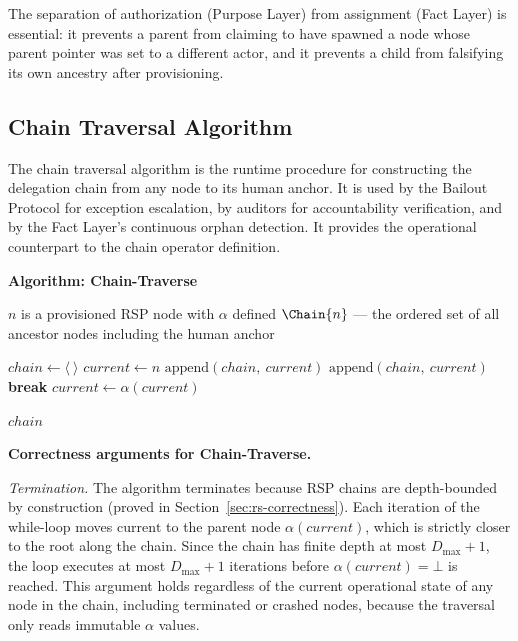 The separation of authorization (Purpose Layer) from assignment (Fact Layer) is essential: it prevents a parent from claiming to have spawned a node whose parent pointer was set to a different actor, and it prevents a child from falsifying its own ancestry after provisioning.

\subsection{Chain Traversal Algorithm}
\label{sec:chain-traversal-algorithm}

The chain traversal algorithm is the runtime procedure for constructing the delegation chain from any node to its human anchor. It is used by the Bailout Protocol for exception escalation, by auditors for accountability verification, and by the Fact Layer's continuous orphan detection. It provides the operational counterpart to the chain operator definition.

\medskip
\noindent\textbf{Algorithm: Chain-Traverse}

\begin{algorithm}
\caption{Chain-Traverse($n$) — Build the delegation chain from node $n$ to the human anchor}
\label{alg:chain-traverse}
\begin{algorithmic}[1]
\REQUIRE $n$ is a provisioned RSP node with $\alpha$ defined
\ENSURE $\Chain{n}$ — the ordered set of all ancestor nodes including the human anchor

\STATE $chain \leftarrow \langle\ \rangle$ 
\STATE $current \leftarrow n$ 
    \STATE $\text{append}(chain,\ current)$ 
        \STATE $\text{append}(chain,\ current)$ 
        \STATE \textbf{break} 
    \ENDIF
    \STATE $current \leftarrow \alpha(current)$ 
\ENDWHILE

\RETURN $chain$
\end{algorithmic}
\end{algorithm}

\medskip
\noindent\textbf{Correctness arguments for Chain-Traverse.}

\textit{Termination.} The algorithm terminates because RSP chains are depth-bounded by construction (proved in Section~\ref{sec:rs-correctness}). Each iteration of the while-loop moves $\text{current}$ to the parent node $\alpha(current)$, which is strictly closer to the root along the chain. Since the chain has finite depth at most $D_{\max} + 1$, the loop executes at most $D_{\max} + 1$ iterations before $\alpha(current) = \bot$ is reached. This argument holds regardless of the current operational state of any node in the chain, including terminated or crashed nodes, because the traversal only reads immutable $\alpha$ values.

